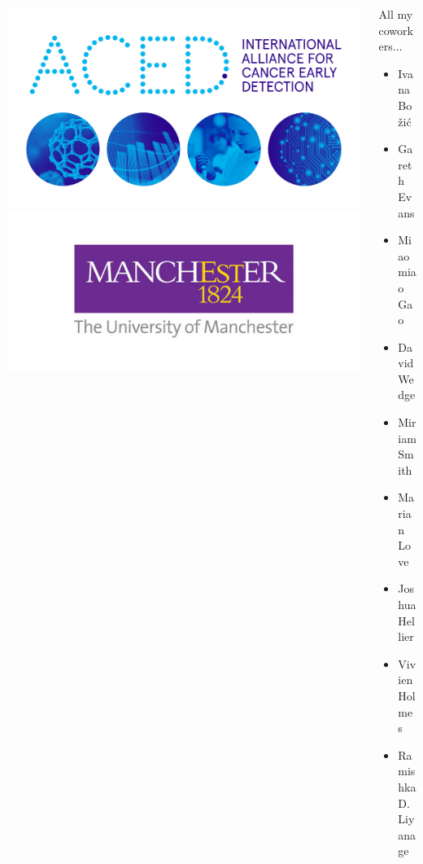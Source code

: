 \documentclass{beamer}
\begin{document}
\begin{frame}
\begin{columns}
\begin{column}{0.5\textwidth}
        \begin{center}
        \includegraphics[width=\textwidth]{figures/aced_website_header.jpg}
        \includegraphics[width=\textwidth]{figures/logo_big.jpg}
        \end{center}

        \end{column}
        \begin{column}{0.5\textwidth}
        All my coworkers...

        \begin{itemize}
            \item Ivana Bo\v{z}i\'{c}
            \item Gareth Evans
            \item Miaomiao Gao
            \item David Wedge
            \item Miriam Smith
            \item Marian Love
            \item Joshua Hellier
            \item Vivien Holmes
            \item Ramishka D. Liyanage
        \end{itemize}

        \end{column}
    \end{columns}
\end{frame}
\end{document}
